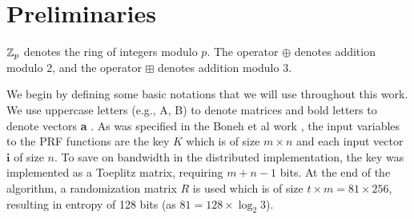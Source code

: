 
\section{Preliminaries}
\label{sec:preliminaries}

$\mathbb{Z}_p$ denotes the ring of integers modulo $p$. The operator $\oplus$ denotes addition modulo 2, and the operator $\boxplus$ denotes addition modulo 3. 

We begin by defining some basic notations that we will use throughout this work. We use uppercase letters (e.g.,
A, B) to denote matrices and bold letters to denote vectors \textbf{a} . As was specified in the Boneh et al work \cite{boneh2018-darkmatter}, the input variables to the PRF functions are the key ${K}$ which is of size $m \times n$ and each input vector $\textbf{i}$ of size $n$. 
To save on bandwidth in the distributed implementation, the key was implemented as a Toeplitz matrix, requiring $m + n - 1$ bits.
At the end of the algorithm, a randomization matrix $R$ is used which is of size $t \times m = 81 \times 256$, resulting in entropy of 128 bits (as $81 = 128 \times \log_2 3$).
